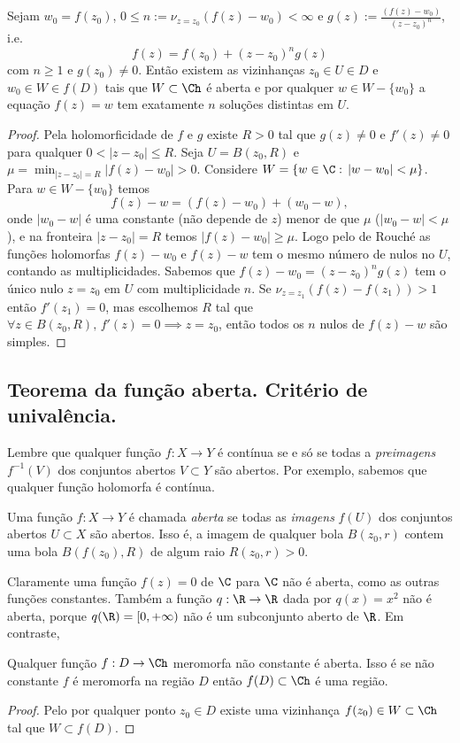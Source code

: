\begin{lema}
\label{l:n-raizes}
Sejam $w_0 =f(z_0)$,
$0\leq n := \nu_{z=z_0}(f(z)-w_0) < \infty$ e $g(z) := \frac{(f(z)-w_0)}{(z-z_0)^n}$,
i.e. 
\[ f(z) = f(z_0) + (z-z_0)^n g(z) \]
 com $n\geq 1$ e $g(z_0)\neq 0$.
Então existem as vizinhanças $z_0 \in U \in D$ e $w_0 \in W \in f(D)$
tais que $W\subset\Ch$ é aberta e por qualquer $w\in W-\{w_0\}$
a equação $f(z) = w$ tem exatamente $n$ soluções distintas em $U$.
\end{lema}
\begin{proof}
Pela holomorficidade de $f$ e $g$ existe $R>0$ tal que $g(z)\neq 0$
e $f'(z)\neq 0$ para
qualquer $0<|z-z_0|\leq R$. Seja $U = B(z_0,R)$ e 
$\mu = \min_{|z-z_0|=R} |f(z)-w_0| > 0$. Considere $W = \{ w\in\C:\, |w-w_0|<\mu \}$.
Para $w\in W - \{w_0\}$ temos
\[ f(z) - w = (f(z) - w_0) + (w_0-w), \]
onde $|w_0-w|$ é uma constante (não depende de $z$) menor de que $\mu$ ($|w_0-w|<\mu$),
e na fronteira $|z-z_0|=R$ temos
$|f(z) - w_0| \geq \mu$. Logo pelo  de Rouché
as funções holomorfas $f(z)-w_0$ e $f(z)-w$ tem o mesmo número de nulos no $U$, contando as multiplicidades.
Sabemos que $f(z)-w_0 = (z-z_0)^n g(z)$ tem o único nulo $z=z_0$ em $U$ com multiplicidade $n$.
Se $\nu_{z=z_1}(f(z)-f(z_1))>1$ então $f'(z_1)=0$, mas escolhemos $R$ tal que 
$\forall z\in B(z_0,R),\,f'(z)=0 \implies z=z_0$, então todos os $n$ nulos de $f(z)-w$ são simples.
\end{proof}

\subsection{Teorema da função aberta. Critério de univalência.}
Lembre que qualquer função $f: X\to Y$ é contínua se e só se
todas a \emph{preimagens} $f^{-1}(V)$ dos conjuntos abertos $V\subset Y$ são abertos.
Por exemplo, sabemos que qualquer função holomorfa é contínua.

Uma função $f: X\to Y$ é chamada \emph{aberta} se todas as \emph{imagens} $f(U)$
dos conjuntos abertos $U\subset X$ são abertos. Isso é, a imagem de qualquer bola $B(z_0,r)$
contem uma bola $B(f(z_0),R)$ de algum raio $R(z_0,r)>0$.

Claramente uma função $f(z) = 0$ de $\C$ para $\C$ não é aberta, como as outras funções constantes.
Também a função $q: \R \to \R$ dada por $q(x) = x^2$ não é aberta,
porque $q(\R) = [0,+\infty)$ não é um subconjunto aberto de $\R$.
Em contraste,
\begin{teorema}
Qualquer função $f: D\to \Ch$ meromorfa não constante é aberta.
Isso é se não constante $f$ é meromorfa na região $D$ então $f(D) \subset \Ch$ é uma região.
\end{teorema}
\begin{proof}
Pelo  por qualquer ponto $z_0\in D$ existe uma vizinhança $f(z_0) \in W \subset \Ch$
tal que $W\subset f(D)$.
\end{proof}

